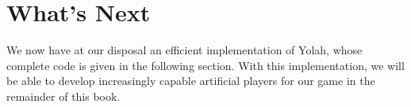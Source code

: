 \documentclass[12pt,a4paper,twoside,openright]{book}
\begin{document}

\section{What's Next}


We now have at our disposal an efficient implementation of Yolah, whose complete code is given in the following section. With this implementation, we will be able to develop increasingly capable artificial players for our game in the remainder of this book.
\end{document}

